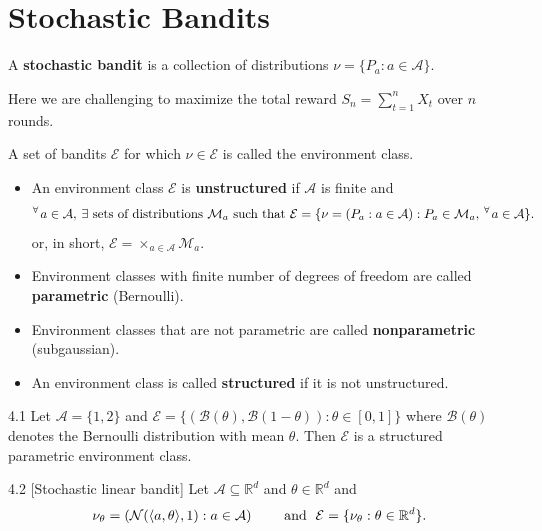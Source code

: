 \documentclass[10pt]{article}
\theoremstyle{definition}
\newenvironment{example*}[1]{%
  \IfBlankTF{#1}
    {\renewcommand{\themanualexampleinner}{\unskip}}
    {\renewcommand\themanualexampleinner{#1}}%
  \manualexampleinner
}{\endmanualexampleinner}
\newenvironment{definition*}[1]{%
  \IfBlankTF{#1}
    {\renewcommand{\themanualdefinitioninner}{\unskip}}
    {\renewcommand\themanualdefinitioninner{#1}}%
  \manualdefinitioninner
}{\endmanualdefinitioninner}
\begin{document}
\section{Stochastic Bandits}
\begin{definition*}{}
    A \textbf{stochastic bandit} is a collection of distributions $\nu = \{P_a : a \in \mathcal{A} \}$.
\end{definition*}
Here we are challenging to maximize the total reward $S_n = \sum_{t=1}^{n} X_t$ over $n$ rounds.
\begin{definition*}{}
    A set of bandits $\mathcal{E}$ for which $\nu \in \mathcal{E}$ is called the environment class.
    \begin{itemize}{}
        \item An environment class $\mathcal{E}$ is \textbf{unstructured} if $\mathcal{A}$ is finite and
        \begin{equation*}
            ^\forall \hspace{0.1em} a \in \mathcal{A}, \hspace{0.2em} \exists \text{ sets of distributions } \mathcal{M}_a \text{ such that } \mathcal{E} = \{ \nu = (P_a : a \in \mathcal{A}) : P_a \in \mathcal{M}_a, \hspace{0.2em} ^\forall \hspace{0.1em} a \in \mathcal{A}\}.
        \end{equation*}
        or, in short, $\mathcal{E} = \times_{a \in \mathcal{A}} \mathcal{M}_a$.
        \item Environment classes with finite number of degrees of freedom are called \textbf{parametric} (Bernoulli).
        \item Environment classes that are not parametric are called \textbf{nonparametric} (subgaussian).
        \item An environment class is called \textbf{structured} if it is not unstructured.
    \end{itemize}
\end{definition*}

\begin{example*}{4.1}
    Let $\mathcal{A} = \{1, 2\}$ and $\mathcal{E} = \{ (\mathcal{B}(\theta), \mathcal{B}(1-\theta)): \theta \in [0,1]\}$ where $\mathcal{B}(\theta)$ denotes the Bernoulli distribution with mean $\theta$.
    Then $\mathcal{E}$ is a structured parametric environment class.
\end{example*}

\begin{example*}{4.2} [Stochastic linear bandit]
    Let $\mathcal{A} \subseteq \mathbb{R}^d$ and $\theta \in \mathbb{R}^d$ and
    \begin{equation*}
        \nu_\theta = ( \mathcal{N}(\langle a, \theta \rangle, 1) : a \in \mathcal{A} ) \hspace{2em} \text{ and } \hspace{0.3em} \mathcal{E} = \{ \nu_\theta : \theta \in \mathbb{R}^d \}.
    \end{equation*}
\end{example*}
\end{document}
